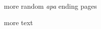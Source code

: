 \begin{pages}
\begin{Leftside}
\beginnumbering
\pstart
more random \emph{apa}
ending pages

\pend
\endnumbering
\end{Leftside}
\begin{Rightside}
\beginnumbering
\endnumbering
\end{Rightside}
\end{pages}
\Pages
more text

